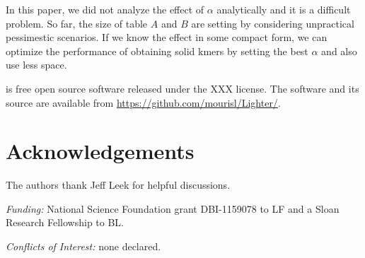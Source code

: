 \documentclass[10pt]{article}
\begin{document}



In this paper, we did not analyze the effect of $\alpha$ analytically and it is a difficult problem. So far, the size of table $A$ and $B$ are setting by considering unpractical pessimestic scenarios. If we know the effect in some compact form, we can optimize the performance of obtaining solid kmers by setting the best $\alpha$ and also use less space.

\tool is free open source software released under the XXX license.  The software and its source are available from \url{https://github.com/mourisl/Lighter/}.

\section*{Acknowledgements}
The authors thank Jeff Leek for helpful discussions.

\noindent\emph{Funding:} National Science Foundation grant DBI-1159078 to LF and a Sloan Research Fellowship to BL.

\noindent\emph{Conflicts of Interest:} none declared.



\end{document}
